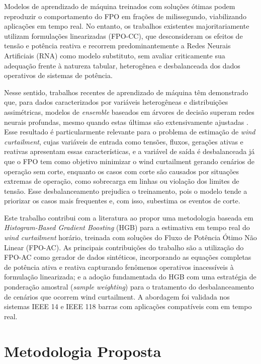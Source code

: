 \documentclass[conference]{IEEEtran}
\begin{document}
Modelos de aprendizado de máquina treinados com soluções ótimas podem reproduzir o comportamento do FPO em frações de milissegundo, viabilizando aplicações em tempo real. No entanto, os trabalhos
existentes majoritariamente utilizam formulações linearizadas (FPO-CC), que
desconsideram os efeitos de tensão e potência reativa e recorrem predominantemente a Redes Neurais Artificiais (RNA) como modelo
substituto, sem avaliar criticamente sua adequação frente à natureza
tabular, heterogênea e desbalanceada dos dados operativos de sistemas de
potência.

Nesse sentido, trabalhos recentes de aprendizado de máquina têm demonstrado que, para dados caracterizados por variáveis heterogêneas e distribuições assimétricas, modelos de \textit{ensemble} baseados em árvores de decisão superam redes neurais profundas, mesmo quando estas últimas são extensivamente ajustadas \cite{grinsztajn2022tree}. Esse resultado é particularmente relevante para o problema de estimação de \textit{wind curtailment}, cujas variáveis de entrada como tensões, fluxos, gerações ativas e reativas apresentam essas características, e a variável de saída é desbalanceada já que o FPO tem como objetivo minimizar o wind curtailment gerando cenários de operação sem corte, enquanto os casos com corte são causados por situações extremas de operação, como sobrecarga em linhas ou violação dos limites de tensão. Esse desbalanceamento prejudica o treinamento, pois o modelo tende a priorizar os casos mais frequentes e, com isso, subestima os eventos de corte.

Este trabalho contribui com a literatura ao propor uma metodologia baseada em \textit{Histogram-Based Gradient Boosting} (HGB) para a estimativa em tempo real do \textit{wind curtailment} horário, treinada com soluções do Fluxo de Potência Ótimo Não Linear (FPO-AC). As principais contribuições do trabalho são a utilização do FPO-AC como gerador de dados sintéticos,
incorporando as equações completas de potência ativa e reativa capturando fenômenos operativos inacessíveis à formulação linearizada; e a adoção fundamentada do HGB com uma estratégia de ponderação amostral (\textit{sample weighting}) para o tratamento do desbalanceamento de cenários que ocorrem wind curtailment. A abordagem foi validada nos sistemas
IEEE 14 e IEEE 118 barras com aplicações compatíveis com  em tempo real.

\section{Metodologia Proposta}
\end{document}
